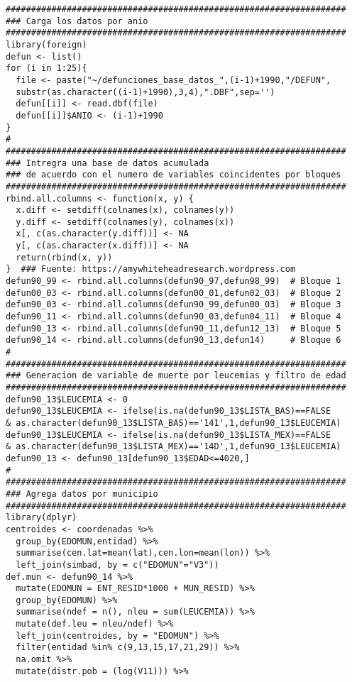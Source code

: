 \documentclass[11pt, oneside]{book}
\begin{document}
\begin{verbatim}
###################################################################
### Carga los datos por anio
###################################################################
library(foreign)
defun <- list()
for (i in 1:25){
  file <- paste("~/defunciones_base_datos_",(i-1)+1990,"/DEFUN",
  substr(as.character((i-1)+1990),3,4),".DBF",sep='')
  defun[[i]] <- read.dbf(file)
  defun[[i]]$ANIO <- (i-1)+1990
}
#
###################################################################
### Intregra una base de datos acumulada 
### de acuerdo con el numero de variables coincidentes por bloques
###################################################################
rbind.all.columns <- function(x, y) {
  x.diff <- setdiff(colnames(x), colnames(y))
  y.diff <- setdiff(colnames(y), colnames(x))
  x[, c(as.character(y.diff))] <- NA
  y[, c(as.character(x.diff))] <- NA
  return(rbind(x, y))
}  ### Fuente: https://amywhiteheadresearch.wordpress.com
defun90_99 <- rbind.all.columns(defun90_97,defun98_99)  # Bloque 1
defun00_03 <- rbind.all.columns(defun00_01,defun02_03)  # Bloque 2
defun90_03 <- rbind.all.columns(defun90_99,defun00_03)  # Bloque 3
defun90_11 <- rbind.all.columns(defun90_03,defun04_11)  # Bloque 4
defun90_13 <- rbind.all.columns(defun90_11,defun12_13)  # Bloque 5
defun90_14 <- rbind.all.columns(defun90_13,defun14)     # Bloque 6
#
###################################################################
### Generacion de variable de muerte por leucemias y filtro de edad
###################################################################
defun90_13$LEUCEMIA <- 0
defun90_13$LEUCEMIA <- ifelse(is.na(defun90_13$LISTA_BAS)==FALSE 
& as.character(defun90_13$LISTA_BAS)=='141',1,defun90_13$LEUCEMIA)
defun90_13$LEUCEMIA <- ifelse(is.na(defun90_13$LISTA_MEX)==FALSE 
& as.character(defun90_13$LISTA_MEX)=='14D',1,defun90_13$LEUCEMIA)
defun90_13 <- defun90_13[defun90_13$EDAD<=4020,]
#
###################################################################
### Agrega datos por municipio
###################################################################
library(dplyr)
centroides <- coordenadas %>% 
  group_by(EDOMUN,entidad) %>% 
  summarise(cen.lat=mean(lat),cen.lon=mean(lon)) %>% 
  left_join(simbad, by = c("EDOMUN"="V3"))
def.mun <- defun90_14 %>% 
  mutate(EDOMUN = ENT_RESID*1000 + MUN_RESID) %>% 
  group_by(EDOMUN) %>% 
  summarise(ndef = n(), nleu = sum(LEUCEMIA)) %>% 
  mutate(def.leu = nleu/ndef) %>% 
  left_join(centroides, by = "EDOMUN") %>% 
  filter(entidad %in% c(9,13,15,17,21,29)) %>% 
  na.omit %>%
  mutate(distr.pob = (log(V11))) %>% 

\end{verbatim}
\end{document}
